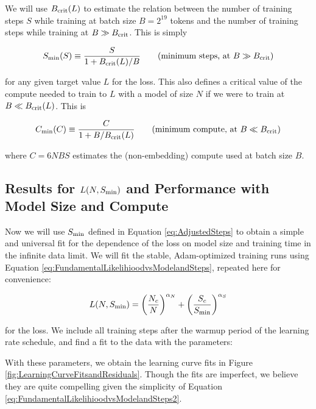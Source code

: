 We will use $B_{\rm crit}(L)$ to estimate the relation between the number of training steps $S$ while training at batch size $B = 2^{19}$ tokens and the number of training steps while training at $B \gg B_{\rm crit}$.  This is simply

\begin{equation}
\label{eq:AdjustedSteps}
S_{\rm min}(S) \equiv \frac{S}{1 + B_{\rm crit}(L)/B} \qquad (\text{minimum steps, at } B \gg B_{\rm crit})
\end{equation}

for any given target value $L$ for the loss.  This also defines a critical value of the compute needed to train to $L$ with a model of size $N$ if we were to train at $B \ll B_{\rm crit}(L)$. This is

\begin{equation}
\label{eq:AdjustedCompute}
C_{\rm min}(C) \equiv \frac{C  }{1 + B/B_{\rm crit}(L) } \qquad (\text{minimum compute, at } B \ll B_{\rm crit})
\end{equation}

where $C = 6 N BS$ estimates the (non-embedding) compute used at batch size $B$.

\subsection{Results for $L(N, S_{\rm min})$ and Performance with Model Size and Compute}

Now we will use $S_{\rm min}$ defined in Equation \eqref{eq:AdjustedSteps} to obtain a  simple and universal fit for the dependence of the loss on model size and training time in the infinite data limit.  We will fit the stable, Adam-optimized training runs using Equation \eqref{eq:FundamentalLikelihioodvsModelandSteps}, repeated here for convenience:

\begin{equation}
\label{eq:FundamentalLikelihioodvsModelandSteps2}
L(N, S_{\rm min}) = \left( \frac{N_c}{N} \right)^{\alpha_N}  + \left( \frac{S_c }{S_{\rm min}} \right)^{\alpha_S}
\end{equation}

for the loss.  We include all training steps after the warmup period of the learning rate schedule, and find  a fit to the data with the parameters:

With these parameters, we obtain the learning curve fits in Figure \ref{fig:LearningCurveFitsandResiduals}.  Though the fits are imperfect, we believe they are quite compelling given the simplicity of Equation \eqref{eq:FundamentalLikelihioodvsModelandSteps2}.  

